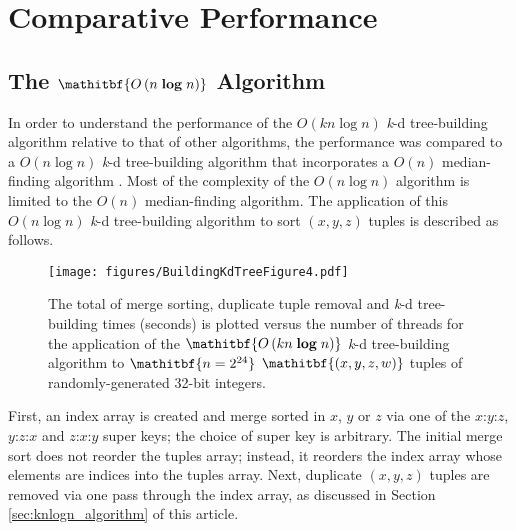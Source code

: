 \documentclass{sig-alternate}
\begin{document}
\section{Comparative Performance}
\subsection{The $\mathitbf{O\left(n \; \boldsymbol{\log} \; n\right)}$ Algorithm}
\label{sec:nlogn_algorithm}

In order to understand the performance of the $O\left(kn \log n\right)$ \emph{k}-d tree-building algorithm relative to that of other algorithms, the performance was compared to a $O\left(n \log n\right)$ \emph{k}-d tree-building algorithm that incorporates a $O\left(n\right)$ median-finding algorithm \cite{Blum}.  Most of the complexity of the $O\left(n \log n\right)$ algorithm is limited to the $O\left(n\right)$ median-finding algorithm.  The application of this $O\left(n \log n\right)$ \emph{k}-d tree-building algorithm to sort $\left(x,y,z\right)$ tuples is described as follows.

\begin{figure}[h!]
\centering
\centerline{\texttt{[image: figures/BuildingKdTreeFigure4.pdf]}}
\caption{The total of merge sorting, duplicate tuple removal and \emph{k}-d tree-building times (seconds) is plotted versus the number of threads for the application of the $\mathitbf{O\left(kn \; \boldsymbol{\log} \; n\right)}$ \emph{k}-d tree-building algorithm to  $\mathitbf{n = 2^{24}}$ $\mathitbf{\left(x,y,z,w\right)}$ tuples of randomly-generated 32-bit integers.}
\label{fig:BuildingParallel}
\end{figure}

First, an index array is created and merge sorted in $x$, $y$ or $z$ via one of the $x$:$y$:$z$, $y$:$z$:$x$ and $z$:$x$:$y$ super keys; the choice of super key is arbitrary.  The initial merge sort does not reorder the tuples array; instead, it reorders the index array whose elements are indices into the tuples array.  Next, duplicate $\left(x,y,z\right)$ tuples are removed via one pass through the index array, as discussed in Section \ref{sec:knlogn_algorithm} of this article.
\end{document}
